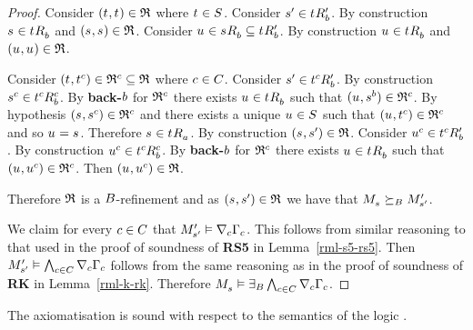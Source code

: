 \begin{proof}
Consider $(\kStateT, \kStateT) \in \refinement$ where $\kStateT \in \kStates$.
Consider $\kStateSP \in \kSuccessorsPB{\kStateT}$.
By construction $\kStateS \in \kSuccessorsB{\kStateT}$ and $(\kStateS, \kStateS) \in \refinement$.
Consider $\kStateU \in \kSuccessorsB{\kStateS} \subseteq \kSuccessorsPB{\kStateT}$.
By construction $\kStateU \in \kSuccessorsB{\kStateT}$ and $(\kStateU, \kStateU) \in \refinement$.

Consider $(\kStateT, \kStateT[\agentC]) \in \refinement^\agentC \subseteq \refinement$ where $\agentC \in \agentsC$.
Consider $\kStateSP \in \kSuccessorsPB{\kStateT[\agentC]}$.
By construction $\kStateS[\agentC] \in \kSuccessorsB[\agentC]{\kStateT[\agentC]}$.
By {\bf back-$\agentB$} for $\refinement^\agentC$ there exists $\kStateU \in \kSuccessorsB{\kStateT}$ such that $(\kStateU, \kStateS[\agentB]) \in \refinement^\agentC$.
By hypothesis $(\kStateS, \kStateS[\agentC]) \in \refinement^\agentC$ and there exists a unique $\kStateU \in \kStates$ such that $(\kStateU, \kStateT[\agentC]) \in \refinement^\agentC$ and so $\kStateU = \kStateS$.
Therefore $\kStateS \in \kSuccessorsA{\kStateT}$.
By construction $(\kStateS, \kStateSP) \in \refinement$.
Consider $\kStateU[\agentC] \in \kSuccessorsPB{\kStateT[\agentC]}$.
By construction $\kStateU[\agentC] \in \kSuccessorsB[\agentC]{\kStateT[\agentC]}$.
By {\bf back-$\agentB$} for $\refinement^\agentC$ there exists $\kStateU \in \kSuccessorsB{\kStateT}$ such that $(\kStateU, \kStateU[\agentC]) \in \refinement^\agentC$.
Then $(\kStateU, \kStateU[\agentC]) \in \refinement$.

Therefore $\refinement$ is a $\agentsB$-refinement and as $(\kStateS, \kStateSP) \in \refinement$ we have that $\kPModel{\kStateS} \simulatesBs \kPModelP{\kStateSP}$.

We claim for every $\agentC \in \agentsC$ that $\kPModelP{\kStateSP} \entails \coversC \Gamma_\agentC$.
This follows from similar reasoning to that used in the proof of soundness of {\bf RS5} in Lemma~\ref{rml-s5-rs5}.
Then $\kPModelP{\kStateSP} \entails \bigwedge_{\agentC \in \agentsC} \coversC \Gamma_\agentC$ follows from the same reasoning as in the proof of soundness of {\bf RK} in Lemma~\ref{rml-k-rk}.
Therefore $\kPModel{\kStateS} \entails \somerefsBs \bigwedge_{\agentC \in \agentsC} \coversC \Gamma_\agentC$.
\end{proof}

\begin{lemma}\label{rml-s5-soundness}
The axiomatisation \axiomRmlS{} is sound with respect to the semantics of the logic \logicRmlS{}.
\end{lemma}

